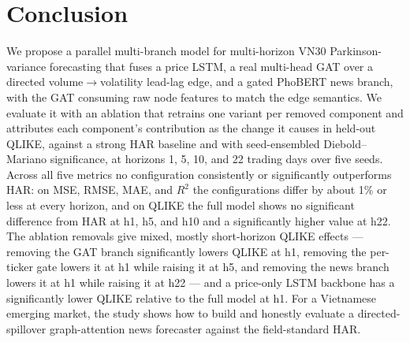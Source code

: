 \documentclass[runningheads]{llncs}
\begin{document}
\section{Conclusion}
\label{sec:conclusion}
We propose a parallel multi-branch model for multi-horizon VN30 Parkinson-variance forecasting that fuses a
price LSTM, a real multi-head GAT over a directed volume$\to$volatility lead-lag edge, and a gated PhoBERT
news branch, with the GAT consuming raw node features to match the edge semantics. We evaluate it with an
ablation that retrains one variant per removed component and attributes each component's contribution as the
change it causes in held-out QLIKE, against a strong HAR baseline and with seed-ensembled Diebold--Mariano
significance, at horizons 1, 5, 10, and 22 trading days over five seeds. Across all five metrics no
configuration consistently or significantly outperforms HAR: on MSE, RMSE, MAE, and $R^2$ the
configurations differ by about 1\% or less at every horizon, and on QLIKE the full model shows no
significant difference from HAR at h1, h5, and h10 and a significantly higher value at h22. The ablation
removals give mixed, mostly short-horizon QLIKE effects --- removing the GAT branch significantly lowers
QLIKE at h1, removing the per-ticker gate lowers it at h1 while raising it at h5, and removing the news
branch lowers it at h1 while raising it at h22 --- and a price-only LSTM backbone has a significantly lower
QLIKE relative to the full model at h1. For a Vietnamese emerging market, the study shows how to build and
honestly evaluate a directed-spillover graph-attention news forecaster against the field-standard HAR.
\end{document}
